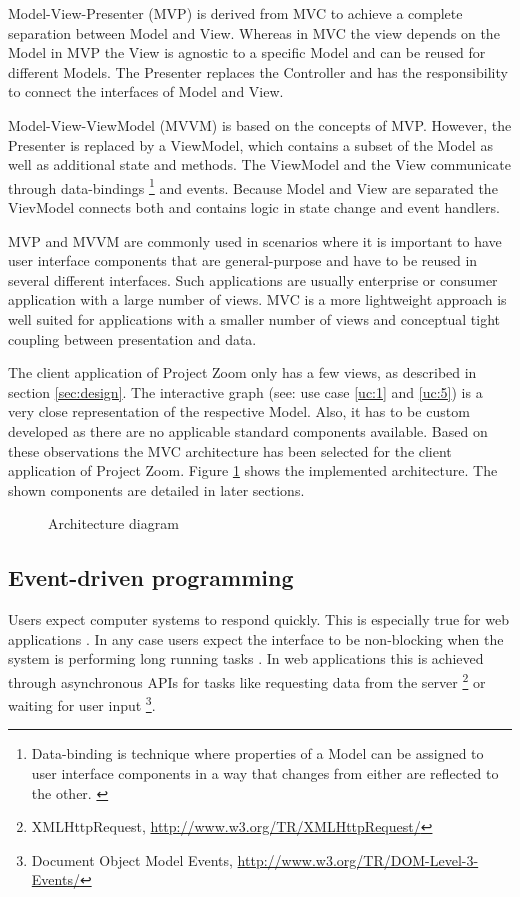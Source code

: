 Model-View-Presenter (MVP) is derived from MVC to achieve a complete separation between Model and View. Whereas in MVC the view depends on the Model in MVP the View is agnostic to a specific Model and can be reused for different Models. The Presenter replaces the Controller and has the responsibility to connect the interfaces of Model and View. 

Model-View-ViewModel (MVVM) is based on the concepts of MVP. However, the Presenter is replaced by a ViewModel, which contains a subset of the Model as well as additional state and methods. The ViewModel and the View communicate through data-bindings \footnote{Data-binding is technique where properties of a Model can be assigned to user interface components in a way that changes from either are reflected to the other. \cite{Bent_2004}} and events. Because Model and View are separated the VievModel connects both and contains logic in state change and event handlers.

MVP and MVVM are commonly used in scenarios where it is important to have user interface components that are general-purpose and have to be reused in several different interfaces. Such applications are usually enterprise or consumer application with a large number of views. MVC is a more lightweight approach is well suited for applications with a smaller number of views and conceptual tight coupling between presentation and data. \cite{Osmani_2012}

The client application of Project Zoom only has a few views, as described in section \ref{sec:design}. The interactive graph (see: use case \ref{uc:1} and \ref{uc:5}) is a very close representation of the respective Model. Also, it has to be custom developed as there are no applicable standard components available. Based on these observations the MVC architecture has been selected for the client application of Project Zoom. Figure \ref{fig:arch} shows the implemented architecture. The shown components are detailed in later sections.

\begin{figure}
\caption{Architecture diagram}
\label{fig:arch}
\end{figure}

\subsection{Event-driven programming}

Users expect computer systems to respond quickly. This is especially true for web applications \cite{Selvidge_1999}. In any case users expect the interface to be non-blocking when the system is performing long running tasks \cite{Nielsen_1990}.  In web applications this is achieved through asynchronous APIs for tasks like requesting data from the server \footnote{XMLHttpRequest, \url{http://www.w3.org/TR/XMLHttpRequest/}} or waiting for user input \footnote{Document Object Model Events, \url{http://www.w3.org/TR/DOM-Level-3-Events/}}.

